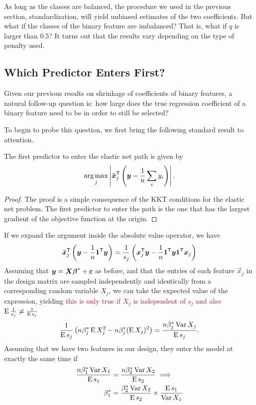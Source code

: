 As long as the classes are balanced, the procedure we used in the previous section, standardization, will yield unbiased estimates of the two coefficients. But what if the classes of the binary feature are imbalanced? That is, what if \(q\) is larger than \(0.5\)? It turns out that the results vary depending on the type of penalty used.

\subsection{Which Predictor Enters First?}

Given our previous results on shrinkage of coefficients of binary features, a natural follow-up question is: how large does the true regression coefficient of a binary feature need to be in order to still be selected?

To begin to probe this question, we first bring the following standard result to attention.

\begin{proposition}
  The first predictor to enter the elastic net path is given by
  \[
    \operatorname*{arg\,max}_j\left| \tilde{\boldsymbol{x}}_j^{\mathsf{T}}\left(\boldsymbol{y} - \frac{1}{n}\sum_i y_i \right)\right|.
  \]
\end{proposition}
\begin{proof}
  The proof is a simple consequence of the KKT conditions for the elastic net problem. The first predictor to enter the path is the one that has the largest gradient of the objective function at the origin.
\end{proof}

If we expand the argument inside the absolute value operator, we have
\[
  \tilde{\boldsymbol{x}}_j^{\mathsf{T}}\left( \boldsymbol{y} - \frac{1}{n}\boldsymbol{1}{}^{\mathsf{T}} \boldsymbol{y}\right) = \frac{1}{s_j}\left(\boldsymbol{x}_j^{\mathsf{T}} \boldsymbol{y} - \frac{1}{n}\boldsymbol{1}^{\mathsf{T}} \boldsymbol{y} \boldsymbol{1}^{\mathsf{T}} \boldsymbol{x}_j\right)
\]
Assuming that \(\boldsymbol{y} = \boldsymbol{X}\boldsymbol{\beta}^* + \boldsymbol{\varepsilon}\) as before, and that the entries of each feature \(\vec{x}_j\) in the design matrix are sampled independently and identically from a corresponding random variable \(X_j\), we can take the expected value of the expression, yielding \textcolor{red}{this is only true if $X_j$ is independent of $s_j$ and also $\operatorname{E} \frac{1}{s_j} \neq \frac{1}{\operatorname{E} s_j}$}
\[
  \frac{1}{\operatorname{E} s_j}\left( n \beta^*_j \operatorname{E} X_j^2 - n \beta^*_j (\operatorname{E} X_j)^2 \right) = \frac{n \beta^*_j\operatorname{Var} X_j}{\operatorname{E} s_j}.
\]
Assuming that we have two features in our design, they enter the model at exactly the same time if
\[
  \begin{aligned}
    \frac{n \beta^*_1\operatorname{Var} X_1}{\operatorname{E} s_1} & = \frac{n \beta^*_2\operatorname{Var} X_2}{\operatorname{E} s_2} \implies                     \\
    \beta^*_1                          & = \frac{\beta^*_2\operatorname{Var} X_2}{\operatorname{E} s_2} \times \frac{\operatorname{E} s_1}{\operatorname{Var} X_1}
  \end{aligned}
\]

